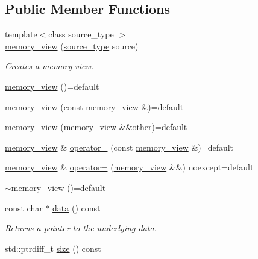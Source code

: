 \subsection*{Public Member Functions}
\begin{DoxyCompactItemize}
\item 
{\footnotesize template$<$class source\+\_\+type $>$ }\\\mbox{\hyperlink{classirk_1_1memory__view_a25918933f1b7944199c65654517d2a72}{memory\+\_\+view}} (\mbox{\hyperlink{irk-score_8cpp_a73f57f67fb1e33bdbfd80bfba2fc9ffe}{source\+\_\+type}} source)
\begin{DoxyCompactList}\small\item\em Creates a memory view. \end{DoxyCompactList}\item 
\mbox{\hyperlink{classirk_1_1memory__view_a8530b1378e96dd8f82416b56248cf9b1}{memory\+\_\+view}} ()=default
\item 
\mbox{\hyperlink{classirk_1_1memory__view_ac1160e860abc324f74e19fdb4eb7b6f1}{memory\+\_\+view}} (const \mbox{\hyperlink{classirk_1_1memory__view}{memory\+\_\+view}} \&)=default
\item 
\mbox{\hyperlink{classirk_1_1memory__view_ac057f2cd40190acb964acd24e1fdeac1}{memory\+\_\+view}} (\mbox{\hyperlink{classirk_1_1memory__view}{memory\+\_\+view}} \&\&other)=default
\item 
\mbox{\hyperlink{classirk_1_1memory__view}{memory\+\_\+view}} \& \mbox{\hyperlink{classirk_1_1memory__view_a3e72e258a7d53b02e292b3875cd5add3}{operator=}} (const \mbox{\hyperlink{classirk_1_1memory__view}{memory\+\_\+view}} \&)=default
\item 
\mbox{\hyperlink{classirk_1_1memory__view}{memory\+\_\+view}} \& \mbox{\hyperlink{classirk_1_1memory__view_ab9e565bd6ca92f5e16b5741f6ef8a708}{operator=}} (\mbox{\hyperlink{classirk_1_1memory__view}{memory\+\_\+view}} \&\&) noexcept=default
\item 
\mbox{\hyperlink{classirk_1_1memory__view_a06b0a6d7117a0edd95323c423ef5c34c}{$\sim$memory\+\_\+view}} ()=default
\item 
const char $\ast$ \mbox{\hyperlink{classirk_1_1memory__view_ab55150c13cf7e380aaaeda8d70d24bed}{data}} () const
\begin{DoxyCompactList}\small\item\em Returns a pointer to the underlying data. \end{DoxyCompactList}\item 
std\+::ptrdiff\+\_\+t \mbox{\hyperlink{classirk_1_1memory__view_af9ae4528f4f33cf24ab65115f96b7e18}{size}} () const

\end{DoxyCompactItemize}
